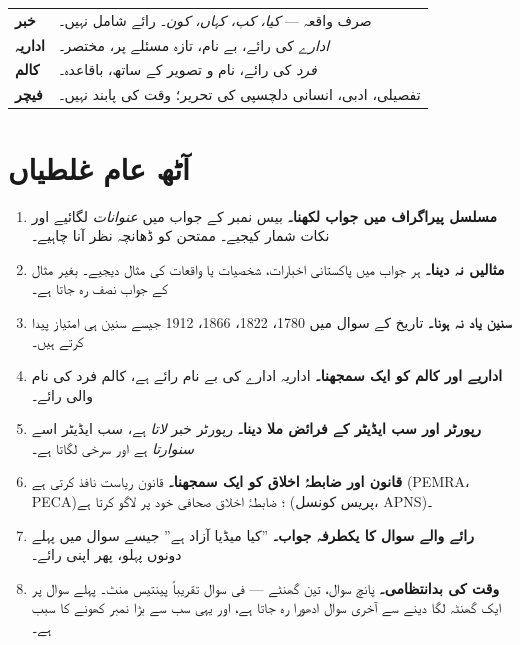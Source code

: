 \medskip
\begin{nukta}
\begin{center}
\begin{tabular}{@{}p{2.6cm} p{11.6cm}@{}}
\toprule
\textbf{خبر} & صرف واقعہ --- \emph{کیا، کب، کہاں، کون}۔ رائے شامل نہیں۔ \\
\textbf{اداریہ} & \emph{ادارے} کی رائے، بے نام، تازہ مسئلے پر، مختصر۔ \\
\textbf{کالم} & \emph{فرد} کی رائے، نام و تصویر کے ساتھ، باقاعدہ۔ \\
\textbf{فیچر} & تفصیلی، ادبی، انسانی دلچسپی کی تحریر؛ وقت کی پابند نہیں۔ \\
\bottomrule
\end{tabular}
\end{center}
\end{nukta}

\clearpage

\section*{آٹھ عام غلطیاں}

\begin{enumerate}\setlength{\itemsep}{5pt}
  \item \textbf{مسلسل پیراگراف میں جواب لکھنا۔} بیس نمبر کے جواب میں
        \emph{عنوانات} لگائیے اور نکات شمار کیجیے۔ ممتحن کو ڈھانچہ نظر آنا
        چاہیے۔
  \item \textbf{مثالیں نہ دینا۔} ہر جواب میں پاکستانی اخبارات، شخصیات یا
        واقعات کی مثال دیجیے۔ بغیر مثال کے جواب نصف رہ جاتا ہے۔
  \item \textbf{سنین یاد نہ ہونا۔} تاریخ کے سوال میں
        \textenglish{1780}، \textenglish{1822}، \textenglish{1866}،
        \textenglish{1912} جیسے سنین ہی امتیاز پیدا کرتے ہیں۔
  \item \textbf{اداریے اور کالم کو ایک سمجھنا۔} اداریہ ادارے کی بے نام رائے
        ہے، کالم فرد کی نام والی رائے۔
  \item \textbf{رپورٹر اور سب ایڈیٹر کے فرائض ملا دینا۔} رپورٹر خبر
        \emph{لاتا} ہے، سب ایڈیٹر اسے \emph{سنوارتا} ہے اور سرخی لگاتا ہے۔
  \item \textbf{قانون اور ضابطۂ اخلاق کو ایک سمجھنا۔} قانون ریاست نافذ کرتی
        ہے (\textenglish{PEMRA}، \textenglish{PECA})؛ ضابطۂ اخلاق صحافی خود پر
        لاگو کرتا ہے (پریس کونسل، \textenglish{APNS})۔
  \item \textbf{رائے والے سوال کا یکطرفہ جواب۔} ''کیا میڈیا آزاد ہے'' جیسے
        سوال میں پہلے دونوں پہلو، پھر اپنی رائے۔
  \item \textbf{وقت کی بدانتظامی۔} پانچ سوال، تین گھنٹے --- فی سوال تقریباً
        پینتیس منٹ۔ پہلے سوال پر ایک گھنٹہ لگا دینے سے آخری سوال ادھورا رہ
        جاتا ہے، اور یہی سب سے بڑا نمبر کھونے کا سبب ہے۔
\end{enumerate}

